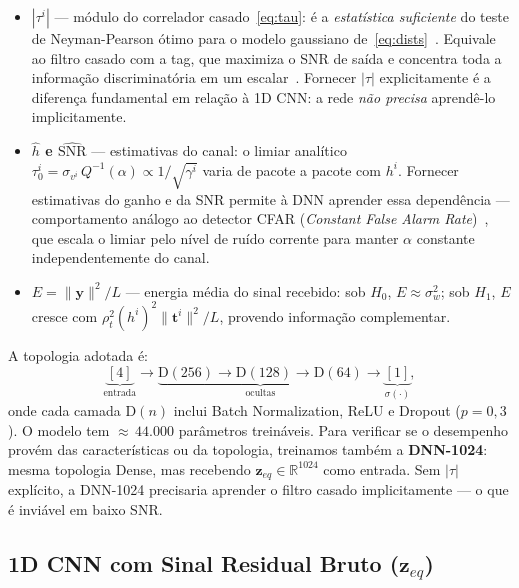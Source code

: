 \documentclass[12pt,a4paper]{article}
\begin{document}
\begin{itemize}
  \item \textbf{$|\tau^i|$} --- módulo do correlador casado~\eqref{eq:tau}: é a \emph{estatística suficiente} do teste de Neyman-Pearson ótimo para o modelo gaussiano de~\eqref{eq:dists}~\cite{ref_poor}. Equivale ao filtro casado com a tag, que maximiza o SNR de saída e concentra toda a informação discriminatória em um escalar~\cite{ref_proakis}. Fornecer $|\tau|$ explicitamente é a diferença fundamental em relação à 1D CNN: a rede \emph{não precisa} aprendê-lo implicitamente.

  \item \textbf{$\hat{h}$ e $\widehat{\text{SNR}}$} --- estimativas do canal: o limiar analítico $\tau_0^i = \sigma_{v^i}\,Q^{-1}(\alpha) \propto 1/\sqrt{\gamma^i}$ varia de pacote a pacote com $h^i$. Fornecer estimativas do ganho e da SNR permite à DNN aprender essa dependência --- comportamento análogo ao detector CFAR (\textit{Constant False Alarm Rate})~\cite{ref_poor}, que escala o limiar pelo nível de ruído corrente para manter $\alpha$ constante independentemente do canal.

  \item \textbf{$E = \|\mathbf{y}\|^2/L$} --- energia média do sinal recebido: sob $H_0$, $E \approx \sigma_w^2$; sob $H_1$, $E$ cresce com $\rho_t^2(h^i)^2\|\mathbf{t}^i\|^2/L$, provendo informação complementar.
\end{itemize}

A topologia adotada é:
\begin{equation}\label{eq:arch4feat}
\underbrace{[4]}_{\text{entrada}}\!\to\!\underbrace{\text{D}(256)\!\to\!\text{D}(128)\!\to\!\text{D}(64)}_{\text{ocultas}}\!\to\!\underbrace{[1]}_{\sigma(\cdot)},
\end{equation}
onde cada camada D$(n)$ inclui Batch Normalization, ReLU e Dropout ($p = 0{,}3$). O modelo tem ${\approx}\,44{.}000$ parâmetros treináveis. Para verificar se o desempenho provém das características ou da topologia, treinamos também a \textbf{DNN-1024}: mesma topologia Dense, mas recebendo $\mathbf{z}_{eq} \in \mathbb{R}^{1024}$ como entrada. Sem $|\tau|$ explícito, a DNN-1024 precisaria aprender o filtro casado implicitamente --- o que é inviável em baixo SNR.

\subsection{1D CNN com Sinal Residual Bruto ($\mathbf{z}_{eq}$)}\label{sec:cnn1d}
\end{document}
